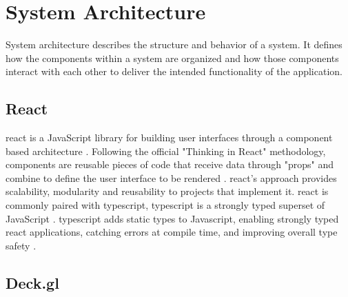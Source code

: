 \section{System Architecture}


System architecture describes the structure and behavior of a system. It defines how the components within a system are organized and how those components interact with each other to deliver the intended functionality of the application.

\subsection{React}
\label{sec:react_theory}

\gls{react} is a JavaScript library for building user interfaces through a component based architecture \parencite{react_docs}. Following the official "Thinking in React" methodology, components are reusable pieces of code that receive data through "props" and combine to define the user interface to be rendered \parencite{react_docs}. \gls{react}'s approach provides scalability, modularity and reusability to projects that implement it. \gls{react} is commonly paired with \gls{typescript}, \gls{typescript} is a strongly typed superset of JavaScript \parencite{typescript_handbook}. \gls{typescript} adds static types to Javascript, enabling strongly typed \gls{react} applications, catching errors at compile time, and improving overall type safety \parencite{typescript_handbook}.


\subsection{Deck.gl}
\label{sec:deckgl}

